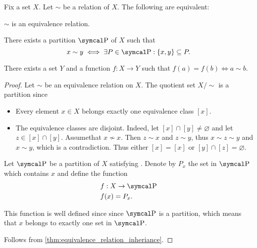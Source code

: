 \begin{proposition}\label{thm:equivalence_partition}
  Fix a set \( X \). Let \( \sim \) be a relation of \( X \). The following are equivalent:
  \begin{defenum}
     \( \sim \) is an equivalence relation.

     There exists a partition \( \CP \) of \( X \) such that
    \begin{equation}\label{thm:equivalence_partition/partition/property}
      x \sim y \iff \exists P \in \CP: \{ x, y \} \subseteq P.
    \end{equation}

     There exists a set \( Y \) and a function \( f: X \to Y \) such that \( f(a) = f(b) \iff a \sim b \).
  \end{defenum}
\end{proposition}
\begin{proof}
   Let \( \sim \) be an equivalence relation on \( X \). The quotient set \( X / \sim \) is a partition since
  \begin{itemize}
    \item Every element \( x \in X \) belongs exactly one equivalence class \( [x] \).
    \item The equivalence classes are disjoint. Indeed, let \( [x] \cap [y] \neq \varnothing \) and let \( z \in [x] \cap [y] \). Assume\LEM that \( x \not\sim x \). Then \( z \sim x \) and \( z \sim y \), thus \( x \sim z \sim y \) and \( x \sim y \), which is a contradiction. Thus either \( [x] = [x] \) or \( [y] \cap [z] = \varnothing \).
  \end{itemize}

   Let \( \CP \) be a partition of \( X \) satisfying . Denote by \( P_x \) the set in \( \CP \) which contains \( x \) and define the function
  \begin{align*}
    &f: X \to \CP \\
    &f(x) = P_x.
  \end{align*}

  This function is well defined since since \( \CP \) is a partition, which means that \( x \) belongs to exactly one set in \( \CP \).

   Follows from \cref{thm:equivalence_relation_inheriance}.
\end{proof}
